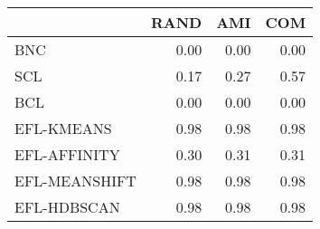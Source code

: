 \begin{tabular}{lrrr}
\toprule
 & RAND & AMI & COM \\
\midrule
BNC & 0.00 & 0.00 & 0.00 \\
SCL & 0.17 & 0.27 & 0.57 \\
BCL & 0.00 & 0.00 & 0.00 \\
EFL-KMEANS & 0.98 & 0.98 & 0.98 \\
EFL-AFFINITY & 0.30 & 0.31 & 0.31 \\
EFL-MEANSHIFT & 0.98 & 0.98 & 0.98 \\
EFL-HDBSCAN & 0.98 & 0.98 & 0.98 \\
\bottomrule
\end{tabular}
